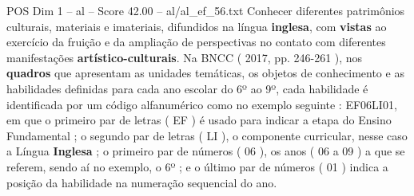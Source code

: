 \begin{textsample}{POS Dim 1 – al – Score 42.00 – al/al\_ef\_56.txt}
Conhecer diferentes patrimônios culturais, materiais e imateriais, difundidos na língua \textbf{inglesa}, com \textbf{vistas} ao exercício da fruição e da ampliação de perspectivas no contato com diferentes manifestações \textbf{artístico-culturais}.
Na BNCC ( 2017, pp. 246-261 ), nos \textbf{quadros} que apresentam as unidades temáticas, os objetos de conhecimento e as habilidades definidas para cada ano escolar do 6º ao 9º, cada habilidade é identificada por um código alfanumérico como no exemplo seguinte : EF06LI01, em que o primeiro par de letras ( EF ) é usado para indicar a etapa do Ensino Fundamental ; o segundo par de letras ( LI ), o componente curricular, nesse caso a Língua \textbf{Inglesa} ; o primeiro par de números ( 06 ), os anos ( 06 a 09 ) a que se referem, sendo aí no exemplo, o 6º ; e o último par de números ( 01 ) indica a posição da habilidade na numeração sequencial do ano.

\end{textsample}
